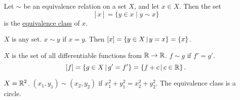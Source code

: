 \documentclass[]{article}
\begin{document}
\newpage

\begin{definition}
	Let $\sim$ be an equivalence relation on a set $X$, and let $x\in X$. Then the set $$[x] = \{y\in x \mid y\sim x\}$$ is the \ul{equivalence class} of $x$.
\end{definition}
\begin{example}
	$X$ is any set. $x\sim y$ if $x=y$. Then $[x] = \left\{ y\in X \, \middle| \, y=x \right\} = \left\{ x \right\}$.
\end{example}
\begin{example}
	$X$ is the set of all differentiable functions from $\mathbb{R}\rightarrow\mathbb{R}$. $f\sim g$ if $f' = g'$. $$[f] = \left\{ g\in X \, \middle| \, g' = f' \right\} = \left\{ f + c \, \middle| \, c\in\mathbb{R} \right\}.$$
\end{example}
\begin{example}
	$X = \mathbb{R}^2$. $(x_1,y_1)\sim (x_2,y_2)$ if $x_1^2 + y_1^2 = x_2^2 + y_2^2$. The equivalence class is a circle.
\end{example}
\end{document}
